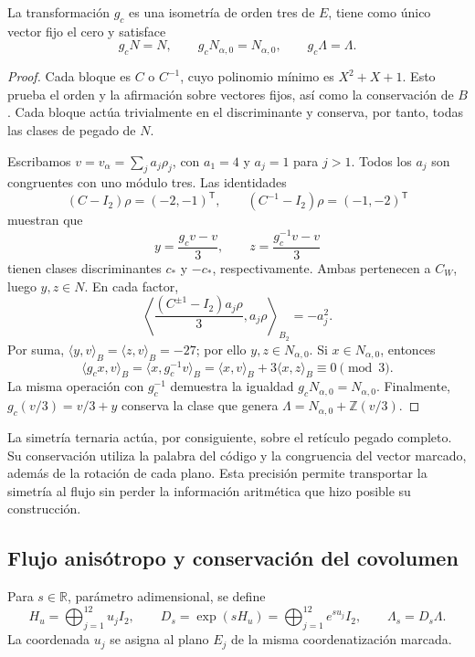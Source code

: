 \begin{proposition}
\label{prop:leech-c3}
La transformación \(g_c\) es una isometría de orden tres de \(E\),
tiene como único vector fijo el cero y satisface
\[
 g_cN=N,\qquad g_cN_{\alpha,0}=N_{\alpha,0},
 \qquad g_c\Lambda=\Lambda.
\]
\end{proposition}
\begin{proof}
Cada bloque es \(C\) o \(C^{-1}\), cuyo polinomio mínimo es
\(X^2+X+1\). Esto prueba el orden y la afirmación sobre vectores fijos,
así como la conservación de \(B\). Cada bloque actúa trivialmente en
el discriminante y conserva, por tanto, todas las clases de pegado de
\(N\).

Escribamos \(v=v_\alpha=\sum_j a_j\rho_j\), con \(a_1=4\) y
\(a_j=1\) para \(j>1\). Todos los \(a_j\) son congruentes con uno
módulo tres. Las identidades
\[
 (C-I_2)\rho=(-2,-1)^{\mathsf T},
 \qquad (C^{-1}-I_2)\rho=(-1,-2)^{\mathsf T}
\]
muestran que
\[
 y=\frac{g_cv-v}{3},\qquad z=\frac{g_c^{-1}v-v}{3}
\]
tienen clases discriminantes \(c_*\) y \(-c_*\), respectivamente.
Ambas pertenecen a \(C_W\), luego \(y,z\in N\). En cada factor,
\[
 \left\langle
 \frac{(C^{\pm1}-I_2)a_j\rho}{3},a_j\rho
 \right\rangle_{B_2}=-a_j^2.
\]
Por suma, \(\langle y,v\rangle_B=\langle z,v\rangle_B=-27\);
por ello \(y,z\in N_{\alpha,0}\).
Si \(x\in N_{\alpha,0}\), entonces
\[
 \langle g_cx,v\rangle_B
  =\langle x,g_c^{-1}v\rangle_B
  =\langle x,v\rangle_B+3\langle x,z\rangle_B
  \equiv0\pmod3.
\]
La misma operación con \(g_c^{-1}\) demuestra la igualdad
\(g_cN_{\alpha,0}=N_{\alpha,0}\). Finalmente,
\(g_c(v/3)=v/3+y\) conserva la clase que genera
\(\Lambda=N_{\alpha,0}+\mathbb Z(v/3)\).
\end{proof}

La simetría ternaria actúa, por consiguiente, sobre el retículo
pegado completo. Su conservación utiliza la palabra del código y
la congruencia del vector marcado, además de la rotación de cada
plano. Esta precisión permite transportar la simetría al flujo sin
perder la información aritmética que hizo posible su construcción.

\subsection{Flujo anisótropo y conservación del covolumen}
\label{subsec:leech-flow}

\begin{definition}
Para \(s\in\mathbb R\), parámetro adimensional, se define
\begin{equation}
 H_u=\bigoplus_{j=1}^{12}u_jI_2,\qquad
 D_s=\exp(sH_u)=\bigoplus_{j=1}^{12}e^{su_j}I_2,\qquad
 \Lambda_s=D_s\Lambda.
 \label{eq:leech-flow}
\end{equation}
La coordenada \(u_j\) se asigna al plano \(E_j\) de la misma coordenatización
marcada.
\end{definition}

